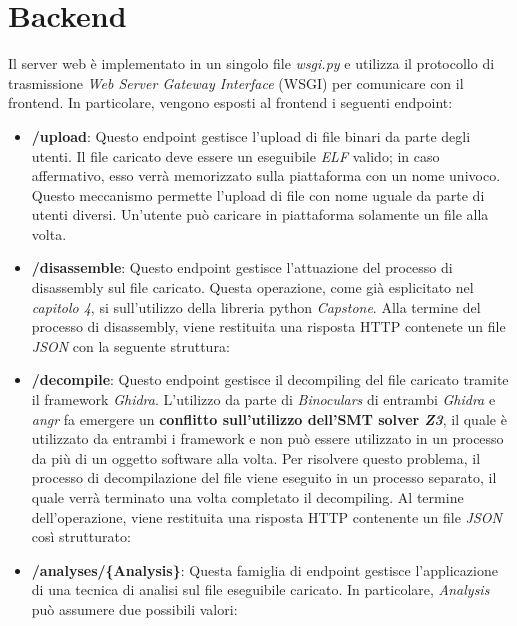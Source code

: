 \documentclass[../main.tex]{subfiles}
\begin{document}
\section{Backend}
Il server web è implementato in un singolo file \textit{wsgi.py} e utilizza il protocollo di trasmissione \textit{Web Server Gateway Interface} (WSGI)
per comunicare con il frontend.
In particolare, vengono esposti al frontend i seguenti endpoint:
\begin{itemize}
    \item \textbf{/upload}: Questo endpoint gestisce l'upload di file binari da parte degli utenti.
    Il file caricato deve essere un eseguibile \textit{ELF} valido; in caso affermativo, esso verrà memorizzato
    sulla piattaforma con un nome univoco. Questo meccanismo permette l'upload di file con nome uguale da parte
    di utenti diversi. Un'utente può caricare in piattaforma solamente un file alla volta.
    \item \textbf{/disassemble}: Questo endpoint gestisce l'attuazione del processo di disassembly sul file caricato.
    Questa operazione, come già esplicitato nel \textit{capitolo 4}, si sull'utilizzo della libreria python \textit{Capstone}.
    Alla termine del processo di disassembly, viene restituita una risposta HTTP contenete un file \textit{JSON} con la seguente struttura:
    
    \item \textbf{/decompile}: Questo endpoint gestisce il decompiling del file caricato tramite il framework \textit{Ghidra}.
    L'utilizzo da parte di \textit{Binoculars} di entrambi \textit{Ghidra} e \textit{angr} fa emergere un \textbf{conflitto sull'utilizzo dell'SMT solver \textit{Z3}}, il quale
    è utilizzato da entrambi i framework e non può essere utilizzato in un processo da più di un oggetto software alla volta.
    Per risolvere questo problema, il processo di decompilazione del file viene eseguito in un processo separato, il quale verrà terminato una volta completato
    il decompiling. Al termine dell'operazione, viene restituita una risposta HTTP contenente un file \textit{JSON} così strutturato:
    
    \item \textbf{/analyses/\{Analysis\}}: Questa famiglia di endpoint gestisce l'applicazione di una tecnica di analisi sul file eseguibile caricato.
    In particolare, \textit{Analysis} può assumere due possibili valori:

\end{itemize}
\end{document}
